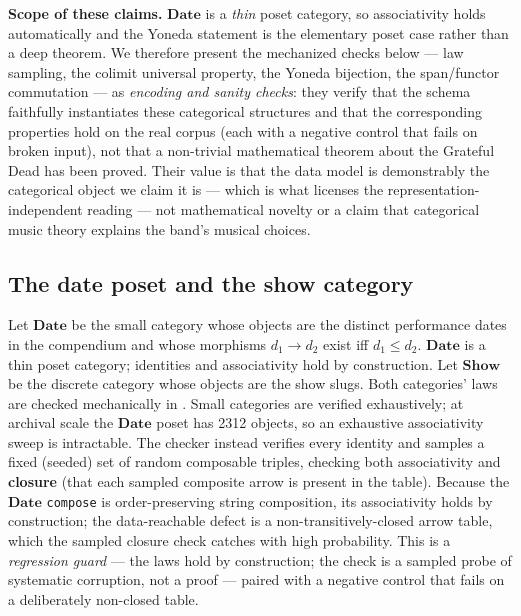 \documentclass[
]{article}
\begin{document}
\textbf{Scope of these claims.} \(\mathbf{Date}\) is a \emph{thin} poset
category, so associativity holds automatically and the Yoneda statement
is the elementary poset case rather than a deep theorem. We therefore
present the mechanized checks below --- law sampling, the colimit
universal property, the Yoneda bijection, the span/functor commutation
--- as \emph{encoding and sanity checks}: they verify that the schema
faithfully instantiates these categorical structures and that the
corresponding properties hold on the real corpus (each with a negative
control that fails on broken input), not that a non-trivial mathematical
theorem about the Grateful Dead has been proved. Their value is that the
data model is demonstrably the categorical object we claim it is ---
which is what licenses the representation-independent reading --- not
mathematical novelty or a claim that categorical music theory explains
the band's musical choices.

\subsection{The date poset and the show
category}\label{the-date-poset-and-the-show-category}

Let \(\mathbf{Date}\) be the small category whose objects are the
distinct performance dates in the compendium and whose morphisms
\(d_1 \to d_2\) exist iff \(d_1 \le d_2\). \(\mathbf{Date}\) is a thin
poset category; identities and associativity hold by construction. Let
\(\mathbf{Show}\) be the discrete category whose objects are the show
slugs. Both categories' laws are checked mechanically in
. Small
categories are verified exhaustively; at archival scale the
\(\mathbf{Date}\) poset has 2312 objects, so an exhaustive associativity
sweep is intractable. The checker instead verifies every identity and
samples a fixed (seeded) set of random composable triples, checking both
associativity and \textbf{closure} (that each sampled composite arrow is
present in the table). Because the \(\mathbf{Date}\) \texttt{compose} is
order-preserving string composition, its associativity holds by
construction; the data-reachable defect is a non-transitively-closed
arrow table, which the sampled closure check catches with high
probability. This is a \emph{regression guard} --- the laws hold by
construction; the check is a sampled probe of systematic corruption, not
a proof --- paired with a negative control that fails on a deliberately
non-closed table.
\end{document}
